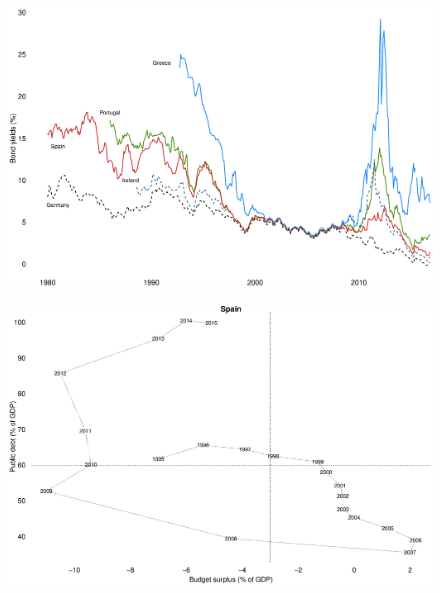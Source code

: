 \documentclass{beamer}
\begin{document}
\begin{frame}
  \begin{figure}
    \includegraphics[scale=.3]{bonds.eps}
  \end{figure}
\end{frame}

\begin{frame}
  \begin{figure}
    \includegraphics[scale=.3]{spain.eps}
  \end{figure}
\end{frame}
\end{document}
